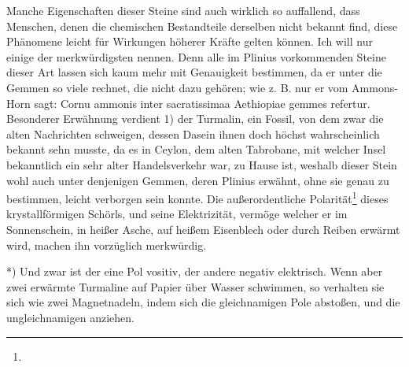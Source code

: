 \documentclass[a4paper, 11pt, oneside, polutonikogreek, german]{article}
\begin{document}
Manche Eigenschaften dieser Steine sind auch wirklich so auffallend, dass Menschen, denen die chemischen Bestandteile derselben nicht bekannt find, diese Phänomene leicht für Wirkungen höherer Kräfte gelten können. Ich will nur einige der merkwürdigsten nennen. Denn alle im Plinius vorkommenden Steine dieser Art lassen sich kaum mehr mit Genauigkeit bestimmen, da er unter die Gemmen so viele rechnet, die nicht dazu gehören; wie z. B. nur er vom Ammons-Horn sagt: Cornu ammonis inter sacratissimaa Aethiopiae gemmes refertur. Besonderer Erwähnung verdient 1) der Turmalin, ein Fossil, von dem zwar die alten Nachrichten schweigen, dessen Dasein ihnen doch höchst wahrscheinlich bekannt sehn musste, da es in Ceylon, dem alten Tabrobane, mit welcher Insel bekanntlich ein sehr alter Handelsverkehr war, zu Hause ist, weshalb dieser Stein wohl auch unter denjenigen Gemmen, deren Plinius erwähnt, ohne sie genau zu bestimmen, leicht verborgen sein konnte. Die außerordentliche Polarität\footnote{} dieses krystallförmigen Schörls, und seine Elektrizität, vermöge welcher er im Sonnenschein, in heißer Asche, auf heißem Eisenblech oder durch Reiben erwärmt wird, machen ihn vorzüglich merkwürdig.

*) Und zwar ist der eine Pol vositiv, der andere negativ elektrisch. Wenn aber zwei erwärmte Turmaline auf Papier über Wasser schwimmen, so verhalten sie sich wie zwei Magnetnadeln, indem sich die gleichnamigen Pole abstoßen, und die ungleichnamigen anziehen.
\end{document}
